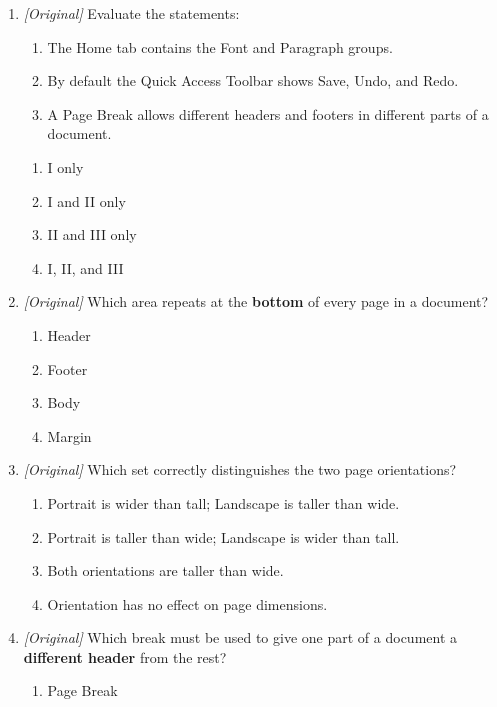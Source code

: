 \documentclass[11pt]{article}
\begin{document}
\begin{enumerate}[label=\textbf{Q\arabic*.}, leftmargin=*]
\begin{enumerate}[label=\Alph*.]
    \item record
    \item margin
  \end{enumerate}
\item \textit{[Original]} Evaluate the statements:
  \begin{enumerate}[label=\Roman*.]
    \item The Home tab contains the Font and Paragraph groups.
    \item By default the Quick Access Toolbar shows Save, Undo, and Redo.
    \item A Page Break allows different headers and footers in different
      parts of a document.
  \end{enumerate}
  \begin{enumerate}[label=\Alph*.]
    \item I only
    \item I and II only
    \item II and III only
    \item I, II, and III
  \end{enumerate}
\item \textit{[Original]} Which area repeats at the \textbf{bottom} of every
  page in a document?
  \begin{enumerate}[label=\Alph*.]
    \item Header
    \item Footer
    \item Body
    \item Margin
  \end{enumerate}
\item \textit{[Original]} Which set correctly distinguishes the two page
  orientations?
  \begin{enumerate}[label=\Alph*.]
    \item Portrait is wider than tall; Landscape is taller than wide.
    \item Portrait is taller than wide; Landscape is wider than tall.
    \item Both orientations are taller than wide.
    \item Orientation has no effect on page dimensions.
  \end{enumerate}
\item \textit{[Original]} Which break must be used to give one part of a
  document a \textbf{different header} from the rest?
  \begin{enumerate}[label=\Alph*.]
    \item Page Break

\end{enumerate}
\end{enumerate}
\end{document}
